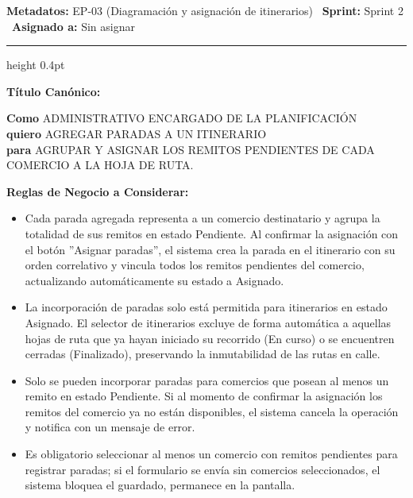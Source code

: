 \documentclass[a4paper,9pt]{article}
\begin{document}
\begin{tcolorbox}[hucard, title={\textbf{HU-46: AGREGAR PARADAS A UN ITINERARIO} \hfill \scriptsize \colorbox{tealstatus}{\textbf{\ Accepted\ }} \quad \colorbox{white}{\textcolor{primarydark}{\textbf{\ 5 pts\ }}}}]
\vspace{-1pt}
\noindent\textbf{\footnotesize Metadatos:} EP-03 (Diagramación y asignación de itinerarios) \textbar\ \textbf{Sprint:} Sprint 2 \textbar\ \textbf{Asignado a:} Sin asignar\par\vspace{2pt}
\hrule height 0.4pt\par\vspace{3pt}
\noindent\textbf{\footnotesize Título Canónico:}\par\vspace{1pt}
{\small \textbf{Como} ADMINISTRATIVO ENCARGADO DE LA PLANIFICACIÓN \\ \textbf{quiero} AGREGAR PARADAS A UN ITINERARIO \\ \textbf{para} AGRUPAR Y ASIGNAR LOS REMITOS PENDIENTES DE CADA COMERCIO A LA HOJA DE RUTA.}\par\vspace{3pt}
\noindent\textbf{\footnotesize Reglas de Negocio a Considerar:}\par\vspace{1pt}
{\footnotesize
\begin{itemize}[leftmargin=12pt, nosep, itemsep=1.5pt, topsep=1pt]
\item Cada parada agregada representa a un comercio destinatario y agrupa la totalidad de sus remitos en estado Pendiente. Al confirmar la asignación con el botón ''Asignar paradas'', el sistema crea la parada en el itinerario con su orden correlativo y vincula todos los remitos pendientes del comercio, actualizando automáticamente su estado a Asignado.
\item La incorporación de paradas solo está permitida para itinerarios en estado Asignado. El selector de itinerarios excluye de forma automática a aquellas hojas de ruta que ya hayan iniciado su recorrido (En curso) o se encuentren cerradas (Finalizado), preservando la inmutabilidad de las rutas en calle.
\item Solo se pueden incorporar paradas para comercios que posean al menos un remito en estado Pendiente. Si al momento de confirmar la asignación los remitos del comercio ya no están disponibles, el sistema cancela la operación y notifica con un mensaje de error.
\item Es obligatorio seleccionar al menos un comercio con remitos pendientes para registrar paradas; si el formulario se envía sin comercios seleccionados, el sistema bloquea el guardado, permanece en la pantalla.

\end{itemize}}
\end{tcolorbox}
\end{document}
